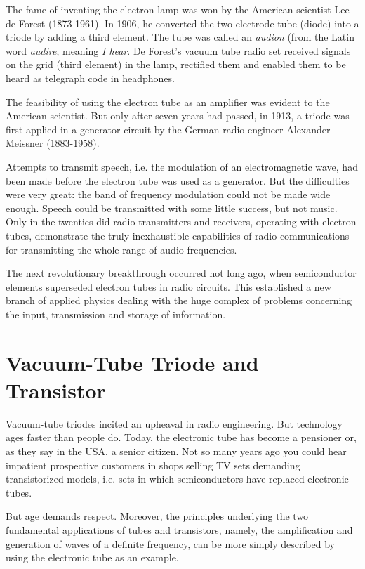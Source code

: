 The fame of inventing the electron lamp was won by the American scientist Lee de Forest (1873-1961). In 1906, he converted the two-electrode tube (diode) into a triode by adding a third element. The tube was called an \emph{audion} (from the Latin word \emph{audire}, meaning \emph{I hear}. De Forest's vacuum tube radio set received signals on the grid (third element) in the lamp, rectified them and enabled them to be heard as telegraph code in headphones.

The feasibility of using the electron tube as an amplifier was evident to the American scientist. But only after seven years had passed, in 1913, a triode was first applied in a generator circuit by the German radio engineer Alexander Meissner (1883-1958).

Attempts to transmit speech, i.e. the modulation of an electromagnetic wave, had been made before the electron tube was used as a generator. But the difficulties were very great: the band of frequency modulation could not be made wide enough. Speech could be transmitted with some little success, but not music. Only in the twenties did radio transmitters and receivers, operating with electron tubes, demonstrate the truly inexhaustible capabilities of radio communications for transmitting the whole range of audio frequencies.


The next revolutionary breakthrough occurred not long ago, when semiconductor elements superseded electron tubes in radio circuits. This established a new branch of applied physics dealing with the huge complex of problems concerning the input, transmission and storage of information.

\section{Vacuum-Tube Triode and Transistor}

Vacuum-tube triodes incited an upheaval in radio engineering. But technology ages faster than people do. Today, the electronic tube has become a pensioner or, as they say in the USA, a senior citizen. Not so many years ago you could hear impatient prospective customers in shops selling TV sets demanding transistorized models, i.e. sets in which semiconductors have replaced electronic tubes.

But age demands respect. Moreover, the principles underlying the two fundamental applications of tubes and transistors, namely, the amplification and generation of waves of a definite frequency, can be more simply described by using the electronic tube as an example.


